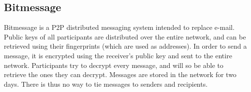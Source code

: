 \subsection{Bitmessage}
Bitmessage\cite{Bitmessage:2014:Online} is a P2P distributed messaging system intended to replace e-mail. Public keys of all participants are distributed over the entire network, and can be retrieved using their fingerprints (which are used as addresses). In order to send a message, it is encrypted using the receiver's public key and sent to the entire network. Participants try to decrypt every message, and will so be able to retrieve the ones they can decrypt. Messages are stored in the network for two days. There is thus no way to tie messages to senders and recipients.